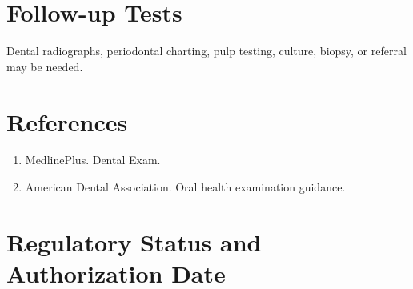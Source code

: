 \section*{Follow-up Tests} Dental radiographs, periodontal charting, pulp testing, culture, biopsy, or referral may be needed.
\section*{References} \begin{enumerate}\item MedlinePlus. Dental Exam.\item American Dental Association. Oral health examination guidance.\end{enumerate}
\clearpage\section*{Regulatory Status and Authorization Date}\clearpage
